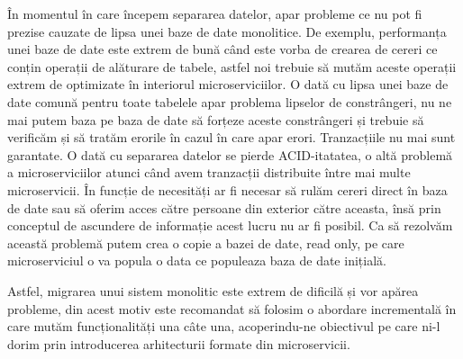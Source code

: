 În momentul în care începem separarea datelor, apar probleme ce nu pot fi prezise cauzate de lipsa
unei baze de date monolitice. De exemplu, performanța unei baze de date este extrem de bună când este vorba
de crearea de cereri ce conțin operații de alăturare de tabele, astfel noi trebuie să mutăm aceste operații
extrem de optimizate în interiorul microserviciilor. O dată cu lipsa unei baze de date comună pentru toate
tabelele apar problema lipselor de constrângeri, nu ne mai putem baza pe baza de date să 
forțeze aceste constrângeri și trebuie să verificăm și să tratăm erorile în cazul în care apar erori.
Tranzacțiile nu mai sunt garantate. O dată cu separarea datelor se pierde ACID-itatatea, o altă problemă 
a microserviciilor atunci când avem tranzacții distribuite între mai multe microservicii. 
În funcție de necesități ar fi necesar să rulăm cereri direct în baza de date sau să oferim acces
către persoane din exterior către aceasta, însă prin conceptul
de ascundere de informație acest lucru nu ar fi posibil. Ca să rezolvăm această problemă putem crea o copie
a bazei de date, read only, pe care microserviciul o va popula o data ce populeaza baza de date inițială.

Astfel, migrarea unui sistem monolitic este extrem de dificilă și vor apărea probleme, din acest
motiv este recomandat să folosim o abordare incrementală în care mutăm funcționalități una câte una,
acoperindu-ne obiectivul pe care ni-l dorim prin introducerea arhitecturii formate din microservicii.











